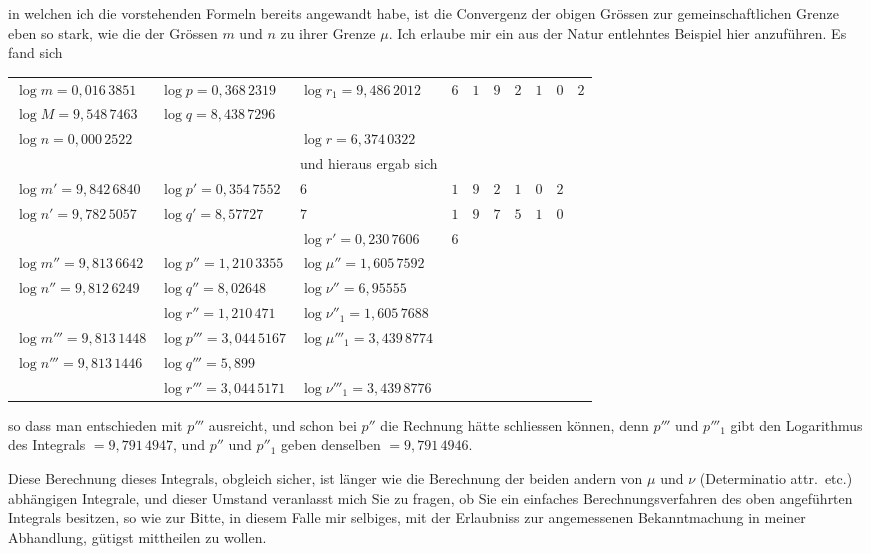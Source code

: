 \documentclass[12pt,a4paper]{article}
\begin{document}
\newpage
\setcounter{page}{445}
%
in welchen ich die vorstehenden Formeln bereits angewandt habe, ist die Convergenz der obigen Grössen zur gemeinschaftlichen Grenze eben so stark, wie die der Grössen $m$ und $n$ zu ihrer Grenze $\mu$. Ich erlaube mir ein aus der Natur entlehntes Beispiel hier anzuführen. Es fand sich
\begin{center}
\begin{tabular}{l@{\quad}l@{\quad}l@{\quad}l}
\toprule
$\log m = 0{,}016\,3851$ & $\log p = 0{,}368\,2319$ & $\log r_1 = 9{,}486\,2012$ & $6$ & $1$ & $9$ & $2$ & $1$ & $0$ & $2$ \\
$\log M = 9{,}548\,7463$ & $\log q = 8{,}438\,7296$\\
\midrule
$\log n = 0{,}000\,2522$ & & $\log r = 6{,}374\,0322$ \\
& & und hieraus ergab sich \\
$\log m' = 9{,}842\,6840$ & $\log p' = 0{,}354\,7552$ & $6$ & $1$ & $9$ & $2$ & $1$ & $0$ & $2$ \\
$\log n' = 9{,}782\,5057$ & $\log q' = 8{,}57727$ & $7$ & $1$ & $9$ & $7$ & $5$ & $1$ & $0$ \\
\midrule
& & $\log r' = 0{,}230\,7606$ & $6$ \\
\midrule
$\log m'' = 9{,}813\,6642$ & $\log p'' = 1{,}210\,3355$ & $\log \mu'' = 1{,}605\,7592$ \\
$\log n'' = 9{,}812\,6249$ & $\log q'' = 8{,}02648$ & $\log \nu'' = 6{,}95555$ \\
\midrule
& $\log r'' = 1{,}210\,471$ & $\log \nu''_1 = 1{,}605\,7688$ \\
\midrule
$\log m''' = 9{,}813\,1448$ & $\log p''' = 3{,}044\,5167$ & $\log \mu'''_1 = 3{,}439\,8774$ \\
$\log n''' = 9{,}813\,1446$ & $\log q''' = 5{,}899$ \\
\midrule
& $\log r''' = 3{,}044\,5171$ & $\log \nu'''_1 = 3{,}439\,8776$ \\
\bottomrule
\end{tabular}
\end{center}
so dass man entschieden mit $p'''$ ausreicht, und schon bei $p''$ die Rechnung hätte schliessen können, denn $p'''$ und $p'''_1$ gibt den Logarithmus des Integrals $= 9{,}791\,4947$, und $p''$ und $p''_1$ geben denselben $= 9{,}791\,4946$.

Diese Berechnung dieses Integrals, obgleich sicher, ist länger wie die Berechnung der beiden andern von $\mu$ und $\nu$ (Determinatio attr.~etc.) abhängigen Integrale, und dieser Umstand veranlasst mich Sie zu fragen, ob Sie ein einfaches Berechnungsverfahren des oben angeführten Integrals besitzen, so wie zur Bitte, in diesem Falle mir selbiges, mit der Erlaubniss zur angemessenen Bekanntmachung in meiner Abhandlung, gütigst mittheilen zu wollen.
\end{document}
